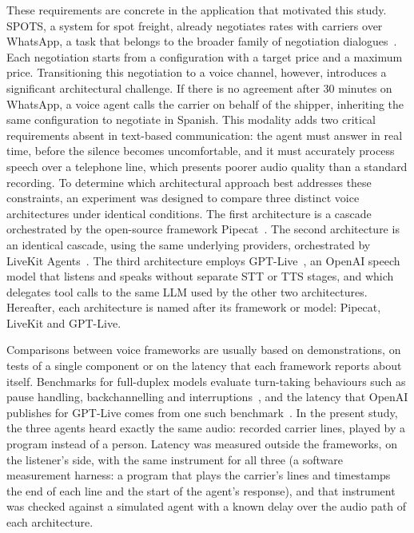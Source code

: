 \documentclass[11pt]{article}
\begin{document}
These requirements are concrete in the application that motivated this study.
SPOTS, a system for spot freight, already negotiates rates with carriers over WhatsApp, a task that belongs to the broader family of negotiation dialogues~\cite{lewis2017deal}.
Each negotiation starts from a configuration with a target price and a maximum price.
Transitioning this negotiation to a voice channel, however, introduces a significant architectural challenge.
If there is no agreement after 30 minutes on WhatsApp, a voice agent calls the carrier on behalf of the shipper, inheriting the same configuration to negotiate in Spanish.
This modality adds two critical requirements absent in text-based communication: the agent must answer in real time, before the silence becomes uncomfortable, and it must accurately process speech over a telephone line, which presents poorer audio quality than a standard recording.
To determine which architectural approach best addresses these constraints, an experiment was designed to compare three distinct voice architectures under identical conditions.
The first architecture is a cascade orchestrated by the open-source framework Pipecat~\cite{pipecat}.
The second architecture is an identical cascade, using the same underlying providers, orchestrated by LiveKit Agents~\cite{livekitagents}.
The third architecture employs GPT-Live~\cite{gptlive}, an OpenAI speech model that listens and speaks without separate STT or TTS stages, and which delegates tool calls to the same LLM used by the other two architectures.
Hereafter, each architecture is named after its framework or model: Pipecat, LiveKit and GPT-Live.

Comparisons between voice frameworks are usually based on demonstrations, on tests of a single component or on the latency that each framework reports about itself.
Benchmarks for full-duplex models evaluate turn-taking behaviours such as pause handling, backchannelling and interruptions~\cite{lin2025fdbench}, and the latency that OpenAI publishes for GPT-Live comes from one such benchmark~\cite{gptlive}.
In the present study, the three agents heard exactly the same audio: recorded carrier lines, played by a program instead of a person.
Latency was measured outside the frameworks, on the listener's side, with the same instrument for all three (a software measurement harness: a program that plays the carrier's lines and timestamps the end of each line and the start of the agent's response), and that instrument was checked against a simulated agent with a known delay over the audio path of each architecture.
\end{document}

